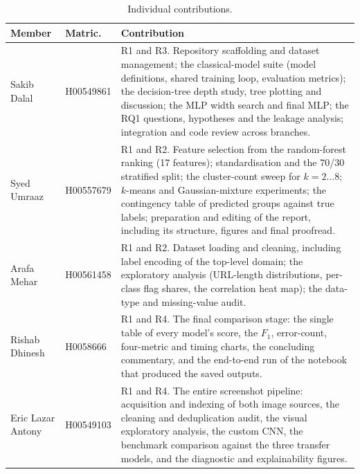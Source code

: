 \documentclass[11pt,journal,a4paper]{IEEEtran}
\newcommand{\tabfont}{\fontsize{11}{13}\selectfont}
\begin{document}
\begin{table}[!ht]
\centering
\caption{Individual contributions.}
\label{tab:contrib}
\tabfont
\setlength{\tabcolsep}{5pt}
\begin{tabular}{@{}>{\raggedright\arraybackslash}p{3.0cm}>{\raggedright\arraybackslash}p{1.8cm}>{\raggedright\arraybackslash}p{10.2cm}@{}}
\toprule
\textbf{Member} & \textbf{Matric.} & \textbf{Contribution} \\
\midrule
Sakib Dalal & H00549861 &
R1 and R3. Repository scaffolding and dataset management; the classical-model suite (model definitions,
shared training loop, evaluation metrics); the decision-tree depth study, tree plotting and discussion; the
MLP width search and final MLP; the RQ1 questions, hypotheses and the leakage analysis; integration and code
review across branches. \\
\addlinespace
Syed Umraaz & H00557679 &
R1 and R2. Feature selection from the random-forest ranking (17 features); standardisation and the 70/30
stratified split; the cluster-count sweep for $k=2\dots8$; $k$-means and Gaussian-mixture experiments; the
contingency table of predicted groups against true labels; preparation and editing of the report, including its
structure, figures and final proofread. \\
\addlinespace
Arafa Mehar & H00561458 &
R1 and R2. Dataset loading and cleaning, including label encoding of the top-level domain; the exploratory
analysis (URL-length distributions, per-class flag shares, the correlation heat map); the data-type and
missing-value audit. \\
\addlinespace
Rishab Dhinesh & H0058666 &
R1 and R4. The final comparison stage: the single table of every model's score, the $F_1$, error-count,
four-metric and timing charts, the concluding commentary, and the end-to-end run of the notebook that produced
the saved outputs. \\
\addlinespace
Eric Lazar Antony & H00549103 &
R1 and R4. The entire screenshot pipeline: acquisition and indexing of both image sources, the cleaning and
deduplication audit, the visual exploratory analysis, the custom CNN, the benchmark comparison against the
three transfer models, and the diagnostic and explainability figures. \\
\bottomrule
\end{tabular}
\end{table}

\clearpage
\end{document}
